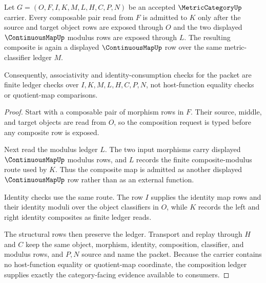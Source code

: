 \begin{theorem}
\label{thm:metric-category-composition-ledger}
Let $G=(O,F,I,K,M,L,H,C,P,N)$ be an accepted $\MetricCategoryUp$ carrier. Every composable pair read from $F$ is admitted to $K$ only after the source and target object rows are exposed through $O$ and the two displayed $\ContinuousMapUp$ modulus rows are exposed through $L$. The resulting composite is again a displayed $\ContinuousMapUp$ row over the same metric-classifier ledger $M$.

Consequently, associativity and identity-consumption checks for the packet are finite ledger checks over $I,K,M,L,H,C,P,N$, not host-function equality checks or quotient-map comparisons.
\end{theorem}
\begin{proof}
Start with a composable pair of morphism rows in $F$. Their source, middle, and target objects are read from $O$, so the composition request is typed before any composite row is exposed.

Next read the modulus ledger $L$. The two input morphisms carry displayed $\ContinuousMapUp$ modulus rows, and $L$ records the finite composite-modulus route used by $K$. Thus the composite map is admitted as another displayed $\ContinuousMapUp$ row rather than as an external function.

Identity checks use the same route. The row $I$ supplies the identity map rows and their identity moduli over the object classifiers in $O$, while $K$ records the left and right identity composites as finite ledger reads.

The structural rows then preserve the ledger. Transport and replay through $H$ and $C$ keep the same object, morphism, identity, composition, classifier, and modulus rows, and $P,N$ source and name the packet. Because the carrier contains no host-function equality or quotient-map coordinate, the composition ledger supplies exactly the category-facing evidence available to consumers.
\end{proof}


